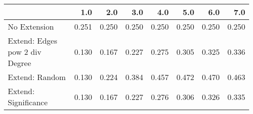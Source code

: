 \begin{tabular}{lrrrrrrr}
\toprule
{} &   1.0 &   2.0 &   3.0 &   4.0 &   5.0 &   6.0 &   7.0 \\
\midrule
No Extension                   & 0.251 & 0.250 & 0.250 & 0.250 & 0.250 & 0.250 & 0.250 \\
Extend: Edges pow 2 div Degree & 0.130 & 0.167 & 0.227 & 0.275 & 0.305 & 0.325 & 0.336 \\
Extend: Random                 & 0.130 & 0.224 & 0.384 & 0.457 & 0.472 & 0.470 & 0.463 \\
Extend: Significance           & 0.130 & 0.167 & 0.227 & 0.276 & 0.306 & 0.326 & 0.335 \\
\bottomrule
\end{tabular}
